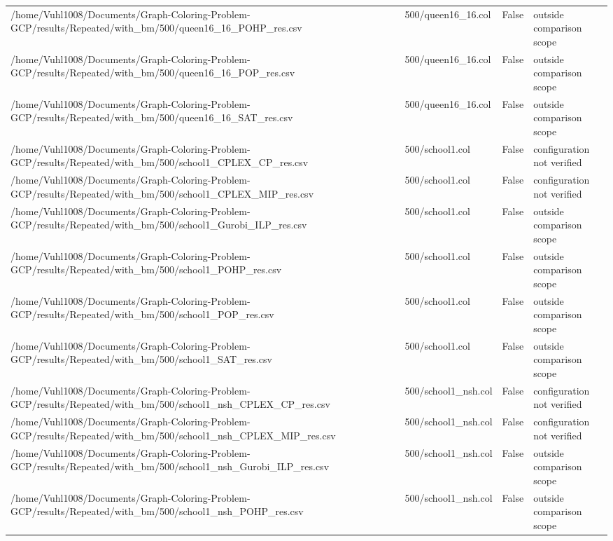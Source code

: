 \begin{table}[htbp]
\begin{tabular}{llll}
/home/Vuhl1008/Documents/Graph-Coloring-Problem-GCP/results/Repeated/with\_bm/500/queen16\_16\_POHP\_res.csv & 500/queen16\_16.col & False & outside comparison scope \\
/home/Vuhl1008/Documents/Graph-Coloring-Problem-GCP/results/Repeated/with\_bm/500/queen16\_16\_POP\_res.csv & 500/queen16\_16.col & False & outside comparison scope \\
/home/Vuhl1008/Documents/Graph-Coloring-Problem-GCP/results/Repeated/with\_bm/500/queen16\_16\_SAT\_res.csv & 500/queen16\_16.col & False & outside comparison scope \\
/home/Vuhl1008/Documents/Graph-Coloring-Problem-GCP/results/Repeated/with\_bm/500/school1\_CPLEX\_CP\_res.csv & 500/school1.col & False & configuration not verified \\
/home/Vuhl1008/Documents/Graph-Coloring-Problem-GCP/results/Repeated/with\_bm/500/school1\_CPLEX\_MIP\_res.csv & 500/school1.col & False & configuration not verified \\
/home/Vuhl1008/Documents/Graph-Coloring-Problem-GCP/results/Repeated/with\_bm/500/school1\_Gurobi\_ILP\_res.csv & 500/school1.col & False & outside comparison scope \\
/home/Vuhl1008/Documents/Graph-Coloring-Problem-GCP/results/Repeated/with\_bm/500/school1\_POHP\_res.csv & 500/school1.col & False & outside comparison scope \\
/home/Vuhl1008/Documents/Graph-Coloring-Problem-GCP/results/Repeated/with\_bm/500/school1\_POP\_res.csv & 500/school1.col & False & outside comparison scope \\
/home/Vuhl1008/Documents/Graph-Coloring-Problem-GCP/results/Repeated/with\_bm/500/school1\_SAT\_res.csv & 500/school1.col & False & outside comparison scope \\
/home/Vuhl1008/Documents/Graph-Coloring-Problem-GCP/results/Repeated/with\_bm/500/school1\_nsh\_CPLEX\_CP\_res.csv & 500/school1\_nsh.col & False & configuration not verified \\
/home/Vuhl1008/Documents/Graph-Coloring-Problem-GCP/results/Repeated/with\_bm/500/school1\_nsh\_CPLEX\_MIP\_res.csv & 500/school1\_nsh.col & False & configuration not verified \\
/home/Vuhl1008/Documents/Graph-Coloring-Problem-GCP/results/Repeated/with\_bm/500/school1\_nsh\_Gurobi\_ILP\_res.csv & 500/school1\_nsh.col & False & outside comparison scope \\
/home/Vuhl1008/Documents/Graph-Coloring-Problem-GCP/results/Repeated/with\_bm/500/school1\_nsh\_POHP\_res.csv & 500/school1\_nsh.col & False & outside comparison scope \\

\end{tabular}
\end{table}
